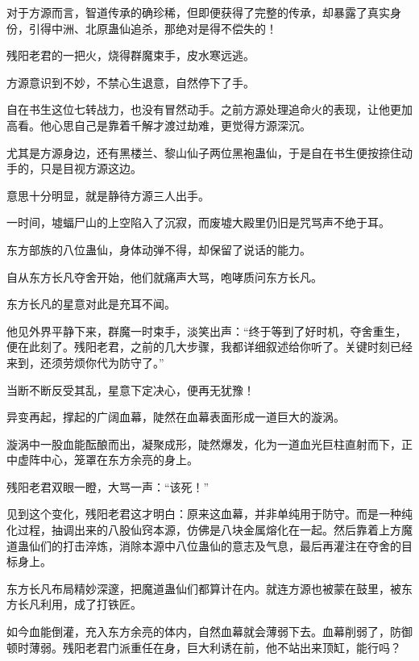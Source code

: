 
\begin{this_body}



对于方源而言，智道传承的确珍稀，但即便获得了完整的传承，却暴露了真实身份，引得中洲、北原蛊仙追杀，那绝对是得不偿失的！

残阳老君的一把火，烧得群魔束手，皮水寒远逃。

方源意识到不妙，不禁心生退意，自然停下了手。

自在书生这位七转战力，也没有冒然动手。之前方源处理追命火的表现，让他更加高看。他心思自己是靠着千解才渡过劫难，更觉得方源深沉。

尤其是方源身边，还有黑楼兰、黎山仙子两位黑袍蛊仙，于是自在书生便按捺住动手的，只是目视方源这边。

意思十分明显，就是静待方源三人出手。

一时间，墟蝠尸山的上空陷入了沉寂，而废墟大殿里仍旧是咒骂声不绝于耳。

东方部族的八位蛊仙，身体动弹不得，却保留了说话的能力。

自从东方长凡夺舍开始，他们就痛声大骂，咆哮质问东方长凡。

东方长凡的星意对此是充耳不闻。

他见外界平静下来，群魔一时束手，淡笑出声：“终于等到了好时机，夺舍重生，便在此刻了。残阳老君，之前的几大步骤，我都详细叙述给你听了。关键时刻已经来到，还须劳烦你代为防守了。”

当断不断反受其乱，星意下定决心，便再无犹豫！

异变再起，撑起的广阔血幕，陡然在血幕表面形成一道巨大的漩涡。

漩涡中一股血能酝酿而出，凝聚成形，陡然爆发，化为一道血光巨柱直射而下，正中虚阵中心，笼罩在东方余亮的身上。

残阳老君双眼一瞪，大骂一声：“该死！”

见到这个变化，残阳老君这才明白：原来这血幕，并非单纯用于防守。而是一种纯化过程，抽调出来的八股仙窍本源，仿佛是八块金属熔化在一起。然后靠着上方魔道蛊仙们的打击淬炼，消除本源中八位蛊仙的意志及气息，最后再灌注在夺舍的目标身上。

东方长凡布局精妙深邃，把魔道蛊仙们都算计在内。就连方源也被蒙在鼓里，被东方长凡利用，成了打铁匠。

如今血能倒灌，充入东方余亮的体内，自然血幕就会薄弱下去。血幕削弱了，防御顿时薄弱。残阳老君门派重任在身，巨大利诱在前，他不站出来顶缸，能行吗？


\end{this_body}
